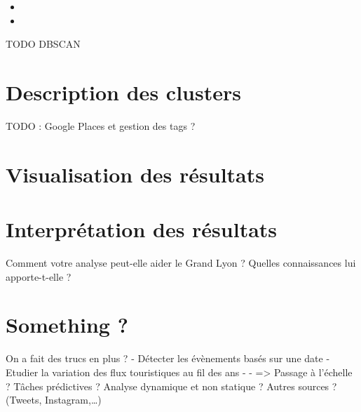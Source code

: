 \begin{itemize}
    \item
    \item
\end{itemize}

TODO DBSCAN
\pagebreak



\section{Description des clusters}
TODO : Google Places et gestion des tags ?
\pagebreak


\section{Visualisation des résultats}
\pagebreak


\section{Interprétation des résultats}
Comment votre analyse peut-elle aider le Grand Lyon ? Quelles connaissances lui apporte-t-elle ?
\pagebreak


\section{Something ?}
On a fait des trucs en plus ?
- Détecter les évènements basés sur une date
- Etudier la variation des flux touristiques au fil des ans
-
-
=> Passage à l’échelle ? Tâches prédictives ? Analyse dynamique et non statique ? Autres sources ? (Tweets, Instagram,…)
\pagebreak

